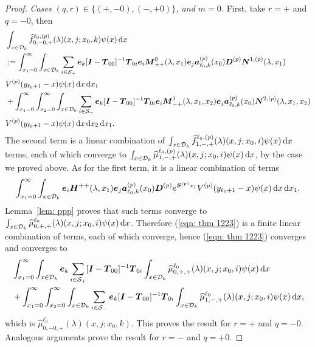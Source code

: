 \begin{proof}
	\textit{Cases \((q,r) \in \{(+,-0),(-,+0)\}\), and \(m=0\).} First, take \(r=+\) and \(q=-0\), then 
	\begin{align}
		&\int_{x\in\mathcal{D}_k}\widehat{f}_{0,-0,+}^{\ell_0,(p)}(\lambda)(x,j;x_0,k)\psi(x)\, \mathrm{d} x \nonumber 
		\\&:=\int_{x_1=0}^\infty \int_{x\in\mathcal{D}_k} \sum_{i\in\mathcal{S}_+}\boldsymbol e_k [\boldsymbol I - \boldsymbol T_{00}]^{-1}\boldsymbol T_{0i}\boldsymbol e_i \boldsymbol M^0_{++}(\lambda,x_1)\boldsymbol e_j \nonumber
		\boldsymbol a_{\ell_0,k}^{(p)}(x_0) \boldsymbol D^{(p)} \boldsymbol N^{1,(p)}(\lambda,x_1) 
		\\& V^{(p)}(y_{\ell_0+1}-x)\psi(x)\, \mathrm{d} x\, \mathrm{d} x_{1}  \nonumber
		\\& + \int_{x_1=0}^\infty\int_{x_2=0}^\infty \int_{x\in\mathcal{D}_k} \sum_{i\in\mathcal{S}_-} \boldsymbol e_k [\boldsymbol I - \boldsymbol T_{00}]^{-1}\boldsymbol T_{0i}\boldsymbol e_i \boldsymbol M^1_{-+}(\lambda,x_1,x_{2})\boldsymbol e_j \nonumber
		\boldsymbol a_{\ell_0,k}^{(p)}(x_0)\boldsymbol N^{2,(p)}(\lambda,x_1,x_{2}) 
		\\& V^{(p)}(y_{\ell_0+1}-x)\psi(x)\, \mathrm{d} x\, \mathrm{d} x_{2} \, \mathrm{d} x_1. \label{eqn: thm 1223}
	\end{align}
	The second term is a linear combination of \(\int_{x\in\mathcal{D}_k}\widehat{f}_{1,-,+}^{\ell_0,(p)}(\lambda)(x,j;x_0,i) \psi(x)\, \mathrm{d} x\) terms, each of which converge to \(\int_{x\in\mathcal{D}_k}\widehat{\mu}_{1,-,+}^{\ell_0,(p)}(\lambda)(x,j;x_0,i) \psi(x)\, \mathrm{d} x\), by the case we proved above. As for the first term, it is a linear combination of terms
	\[\int_{x_1=0}^\infty \int_{x\in\mathcal{D}_k} \boldsymbol e_i \boldsymbol H^{++}(\lambda,x_1)\boldsymbol e_j \nonumber
	\boldsymbol a_{\ell_0,k}^{(p)}(x_0) \boldsymbol D^{(p)} e^{\boldsymbol S^{(p)}x_1} 
	V^{(p)}(y_{\ell_0+1}-x)\psi(x)\, \mathrm{d} x\, \mathrm{d} x_{1}.\]
	Lemma~\ref{lem: ppp} proves that such terms converge to \(\int_{x\in\mathcal{D}_k}\widehat{\mu}_{0,+,+}^{\ell_0}(\lambda)(x,j;x_0,i) \psi(x)\, \mathrm{d} x\). Therefore (\ref{eqn: thm 1223}) is a finite linear combination of terms, each of which converge, hence (\ref{eqn: thm 1223}) converges and converges to 
	\begin{align}
		&\int_{x_1=0}^\infty \int_{x\in\mathcal{D}_k} \boldsymbol e_k \sum_{i\in\mathcal{S}_+} [\boldsymbol I - \boldsymbol T_{00}]^{-1}\boldsymbol T_{0i}\int_{x\in\mathcal{D}_k}\widehat{\mu}_{0,+,+}^{\ell_0}(\lambda)(x,j;x_0,i) \psi(x)\, \mathrm{d} x \nonumber
		\\& + \int_{x_1=0}^\infty\int_{x_2=0}^\infty \int_{x\in\mathcal{D}_k} \sum_{i\in\mathcal{S}_-}\boldsymbol e_k [\boldsymbol I - \boldsymbol T_{00}]^{-1}\boldsymbol T_{0i}\int_{x\in\mathcal{D}_k}\widehat{\mu}_{1,-,+}^{\ell_0}(\lambda)(x,j;x_0,i) \psi(x)\, \mathrm{d} x, \label{eqn: thm 1223B}
	\end{align}
	which is \(\widehat{\mu}_{0,-0,+}^{\ell_0}(\lambda)(x,j;x_0,k)\). This proves the result for \(r=+\) and \(q=-0\). Analogous arguments prove the result for \(r=-\) and \(q=+0\).


\end{proof}
